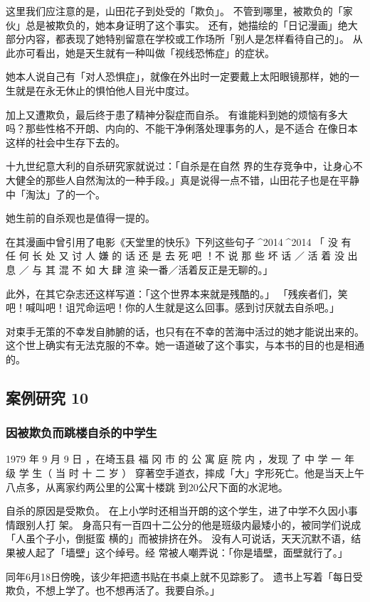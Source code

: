 \documentclass[UTF8]{ctexart}
\begin{document}
这里我们应注意的是，山田花子到处受的「欺负」。
不管到哪里，被欺负的「家伙」总是被欺负的，她本身证明了这个事实。
还有，她描绘的「日记漫画」绝大部分内容，都表现了她特别留意在学校或工作场所「别人是怎样看待自己的」。
从此亦可看出，她是天生就有一种叫做「视线恐怖症」的症状。

她本人说自己有「对人恐惧症」，就像在外出时一定要戴上太阳眼镜那样，她的一生就是在永无休止的惧怕他人目光中度过。

加上又遭欺负，最后终于患了精神分裂症而自杀。
有谁能料到她的烦恼有多大吗？那些性格不开朗、内向的、不能干净俐落处理事务的人，是不适合 在像日本这样的社会中生存下去的。

十九世纪意大利的自杀研究家就说过：「自杀是在自然 界的生存竞争中，让身心不大健全的那些人自然淘汰的一种手段。」真是说得一点不错，山田花子也是在平静中「淘汰」了的一个。 

她生前的自杀观也是值得一提的。

在其漫画中曾引用了电影《天堂里的快乐》下列这些句子^^^^2014^^^^2014 「 没 有 任 何 长 处 又 讨 人 嫌 的 话 还 是 去 死 吧 ！不 说 那 些 坏 话 ／ 活 着 没 出 息 ／ 与 其 混 不 如 大 肆 渲 染一番／活着反正是无聊的。」

此外，在其它杂志还这样写道：「这个世界本来就是残酷的。」
「残疾者们，笑吧！喊叫吧！诅咒命运吧！你的人生就是这么回事。感到讨厌就去自杀吧。」

对束手无策的不幸发自肺腑的话，也只有在不幸的苦海中活过的她才能说出来的。
这个世上确实有无法克服的不幸。她一语道破了这个事实，与本书的目的也是相通的。


\subsection{案例研究 10}
\subsubsection*{因被欺负而跳楼自杀的中学生}

1979 年 9 月 9 日 ，在埼玉县 福 冈 市 的 公 寓 庭 院 内 ，发现 了 中 学 一 年 级 学 生（ 当 时 十 二 岁 ） 穿著空手道衣，摔成「大」字形死亡。他是当天上午八点多，从离家约两公里的公寓十楼跳 到$20$公尺下面的水泥地。

自杀的原因是受欺负。
在上小学时还相当开朗的这个学生，进了中学不久因小事情跟别人打 架。
身高只有一百四十二公分的他是班级内最矮小的，被同学们说成「人虽个子小，倒挺蛮 横的」而被排挤在外。
没有人可说话，天天沉默不语，结果被人起了「墙壁」这个绰号。经 常被人嘲弄说：「你是墙壁，面壁就行了。」

同年6月18日傍晚，该少年把遗书贴在书桌上就不见踪影了。
遗书上写着「每日受欺负，不想上学了。也不想再活了。我要自杀。」
\end{document}
